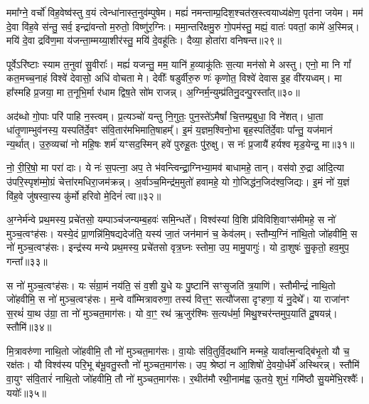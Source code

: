 ममा᳚ग्ने॒ वर्चो॑ विह॒वेष्व॑स्तु व॒यं त्वेन्धा॑नास्त॒नुव॑म्पुषेम। मह्यं॑ नमन्ताम्प्र॒दिश॒श्चत॑स्र॒स्त्वयाध्य॑क्षेण॒ पृत॑ना जयेम। मम॑ दे॒वा वि॑ह॒वे स॑न्तु॒ सर्व॒ इन्द्रा॑वन्तो म॒रुतो॒ विष्णु॑र॒ग्निः। ममा॒न्तरि॑क्षमु॒रु गो॒पम॑स्तु॒ मह्यं॒ वातः॑ पवतां॒ कामे॑ अ॒स्मिन्न्। मयि॑ दे॒वा द्रवि॑ण॒मा य॑जन्ता॒म्मय्या॒शीर॑स्तु॒ मयि॑ दे॒वहू॑तिः। दैव्या॒ होता॑रा वनिषन्त॥२९॥

पूर्वे\-ऽरि॑ष्टाः स्याम त॒नुवा॑ सु॒वीराः᳚। मह्यं॑ यजन्तु॒ मम॒ यानि॑ ह॒व्याकू॑तिः स॒त्या मन॑सो मे अस्तु। एनो॒ मा नि गां᳚ कत॒मच्च॒नाहं विश्वे॑ देवासो॒ अधि॑ वोचता मे। देवीः᳚ षडुर्वीरु॒रु णः॑ कृणोत॒ विश्वे॑ देवास इ॒ह वी॑रयध्वम्। मा हा᳚स्महि प्र॒जया॒ मा त॒नूभि॒र्मा र॑धाम द्विष॒ते सो॑म राजन्न्। अ॒ग्निर्म॒न्युम्प्र॑तिनु॒दन्पु॒रस्ता᳚त्॥३०॥

अद॑ब्धो गो॒पाः परि॑ पाहि न॒स्त्वम्। प्र॒त्यञ्चो॑ यन्तु नि॒गुतः॒ पुन॒स्ते॑\-ऽमैषां᳚ चि॒त्तम्प्र॒बुधा॒ वि ने॑शत्। धा॒ता धा॑तृ॒णाम्भुव॑नस्य॒ यस्पति॑र्दे॒वꣳ स॑वि॒तार॑मभिमाति॒षाहम्᳚। इ॒मं य॒ज्ञम॒श्विनो॒भा बृह॒स्पति॑र्दे॒वाः पा᳚न्तु॒ यज॑मानं न्य॒र्थात्। उ॒रु॒व्यचा॑ नो महि॒षः शर्म॑ यꣳसद॒स्मिन् हवे॑ पुरुहू॒तः पु॑रु॒क्षु। स नः॑ प्र॒जायै॑ हर्यश्व मृड॒येन्द्र॒ मा॥३१॥

नो॒ री॒रि॒षो॒ मा परा॑ दाः। ये नः॑ स॒पत्ना॒ अप॒ ते भ॑वन्त्विन्द्रा॒ग्निभ्या॒मव॑ बाधामहे॒ तान्। वस॑वो रु॒द्रा आ॑दि॒त्या उ॑परि॒स्पृश॑म्मो॒ग्रं चेत्ता॑रमधिरा॒जम॑क्रन्न्। अ॒र्वाञ्च॒मिन्द्र॑म॒मुतो॑ हवामहे॒ यो गो॒जिद्ध॑न॒जिद॑श्व॒जिद्यः। इ॒मं नो॑ य॒ज्ञं वि॑ह॒वे जु॑षस्वा॒स्य कु॑र्मो हरिवो मे॒दिनं॑ त्वा॥३२॥

{\anuvakamend[{व॒नि॒ष॒न्त॒ पु॒रस्ता॒न्मा त्रिच॑त्वारिꣳशच्च॥14॥}]}

अ॒ग्नेर्म॑न्वे प्रथ॒मस्य॒ प्रचे॑तसो॒ यम्पाञ्च॑जन्यम्ब॒हवः॑ समि॒न्धते᳚। विश्व॑स्यां वि॒शि प्र॑विविशि॒वाꣳस॑मीमहे॒ स नो॑ मुञ्च॒त्वꣳह॑सः। यस्ये॒दं प्रा॒णन्नि॑मि॒षद्यदेज॑ति॒ यस्य॑ जा॒तं जन॑मानं च॒ केव॑लम्। स्तौम्य॒ग्निं ना॑थि॒तो जो॑हवीमि॒ स नो॑ मुञ्च॒त्वꣳह॑सः। इन्द्र॑स्य मन्ये प्रथ॒मस्य॒ प्रचे॑तसो वृत्र॒घ्नः स्तोमा॒ उप॒ मामु॒पागुः॑। यो दा॒शुषः॑ सु॒कृतो॒ हव॒मुप॒ गन्ता᳚॥३३॥

स नो॑ मुञ्च॒त्वꣳह॑सः। यः सं॑ग्रा॒मं नय॑ति॒ सं व॒शी यु॒धे यः पु॒ष्टानि॑ सꣳसृ॒जति॑ त्र॒याणि॑। स्तौमीन्द्रं॑ नाथि॒तो जो॑हवीमि॒ स नो॑ मुञ्च॒त्वꣳह॑सः। म॒न्वे वा᳚म्मित्रावरुणा॒ तस्य॑ वित्त॒ꣳ॒ सत्यौ॑जसा दृꣳहणा॒ यं नु॒देथे᳚। या राजा॑नꣳ स॒रथं॑ या॒थ उ॑ग्रा॒ ता नो॑ मुञ्चत॒माग॑सः। यो वा॒ꣳ॒ रथ॑ ऋ॒जुर॑श्मिः स॒त्यध॑र्मा॒ मिथु॒श्चर॑न्तमुप॒याति॑ दू॒षयन्न्॑। स्तौमि॑॥३४॥

मि॒त्रावरु॑णा नाथि॒तो जो॑हवीमि॒ तौ नो॑ मुञ्चत॒माग॑सः। वा॒योः स॑वि॒तुर्वि॒दथा॑नि मन्महे॒ यावा᳚त्म॒न्वद्बि॑भृ॒तो यौ च॒ रक्ष॑तः। यौ विश्व॑स्य परि॒भू ब॑भू॒वतु॒स्तौ नो॑ मुञ्चत॒माग॑सः। उप॒ श्रेष्ठा॑ न आ॒शिषो॑ दे॒वयो॒र्धर्मे॑ अस्थिरन्न्। स्तौमि॑ वा॒युꣳ स॑वि॒तारं॑ नाथि॒तो जो॑हवीमि॒ तौ नो॑ मुञ्चत॒माग॑सः। र॒थीत॑मौ रथी॒नाम॑ह्व ऊ॒तये॒ शुभं॒ गमि॑ष्ठौ सु॒यमे॑भि॒रश्वैः᳚। ययोः᳚॥३५॥

